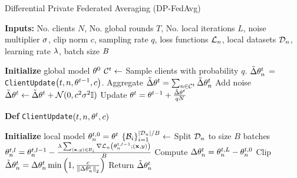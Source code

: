 \begin{algorithm}[H]
  \scriptsize
\caption{Differential Private Federated Averaging (DP-FedAvg)~\citep{mcmahan2017learning}}
\textbf{Inputs:} No. clients $N$, No. global rounds $T$, No. local iterations $L$, noise multiplier $\sigma$, clip norm $c$, sampling rate $q$, loss functions ${\mathcal{L}}_n$, local datasets $\mathcal{D}_n$, learning rate $\lambda$, batch size $B$  \\
\label{alg:dpfl}
\begin{algorithmic}[1]
\State \textbf{Initialize} global model ${\theta}^0$
\State ${\mathcal{C}}^t \gets$ Sample clients with probability $q$.
\State $\tilde{\Delta}{\theta}_n^t$ =  
\texttt{ClientUpdate}$\left(t, n,{\theta}^{t-1}, c\right)$.
\EndFor
\State Aggregate $\tilde{\Delta}{\theta}^t = \sum_{n\in {\mathcal{C}}^t} \tilde{\Delta}{\theta}_n^t$
\State Add noise $\tilde{\Delta}{\theta}^t \gets \tilde{\Delta}{\theta}^t + {\mathcal{N}}(0,c^2\sigma^2{\mathbb{I}})$
\State Update ${\theta}^{t} = {\theta}^{t-1} + \frac{\tilde{\Delta}{\theta}^t}{qN}$
\EndFor
\Statex
\end{algorithmic}
\textbf{Def} \texttt{ClientUpdate}$\left(t, n,{\theta}^{t}, c\right)$
\begin{algorithmic}[1]
\State \textbf{Initialize} local model ${\theta}_n^{t,0}={\theta}^t$
\State $\{{\mathcal{B}}_i\}_{i=1}^{|\mathcal{D}_n|/B} \gets$ Split $\mathcal{D}_n$ to size $B$ batches
\State ${\theta}_n^{t,l} = {\theta}_n^{t,l-1}-\frac{\lambda \sum_{({\mathbf{x}},y)\in {\mathcal{B}}_i} \nabla{\mathcal{L}}_n\left({\theta}_n^{t,l-1};({\mathbf{x}},y)\right)}{B}$
\EndFor
\EndFor
\State Compute $\Delta{\theta}_n^t = {\theta}_n^{t,L} - {\theta}_n^{t,0}$
\State Clip $\tilde{\Delta}{\theta}_n^{t} = \Delta{\theta}_n^t\min\left(1,\frac{c}{\left\|\Delta{\theta}_n^{t}\right\|_2}\right)$  
\State Return $\tilde{\Delta}{\theta}_n^{t}$ 
\end{algorithmic}
\end{algorithm}
